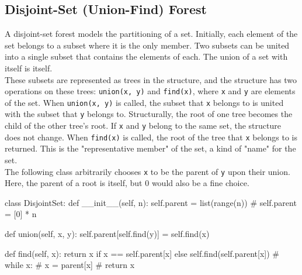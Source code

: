 \documentclass[12pt, titlepage]{article}
\begin{document}
\subsection{Disjoint-Set (Union-Find) Forest}
A disjoint-set forest models the partitioning of a set. Initially, each element of the set belongs to a subset where it is the only member. Two subsets can be united into a single subset that contains the elements of each. The union of a set with itself is itself. \\

These subsets are represented as trees in the structure, and the structure has two operations on these trees: \texttt{union(x, y)} and \texttt{find(x)}, where \texttt{x} and \texttt{y} are elements of the set. When \texttt{union(x, y)} is called, the subset that \texttt{x} belongs to is united with the subset that \texttt{y} belongs to. Structurally, the root of one tree becomes the child of the other tree's root. If \texttt{x} and \texttt{y} belong to the same set, the structure does not change. When \texttt{find(x)} is called, the root of the tree that \texttt{x} belongs to is returned. This is the "representative member" of the set, a kind of "name" for the set. \\

The following class arbitrarily chooses \texttt{x} to be the parent of \texttt{y} upon their union. Here, the parent of a root is itself, but $0$ would also be a fine choice.
\medskip
\begin{python}
class DisjointSet:
    def __init__(self, n):
        self.parent = list(range(n))
        # self.parent = [0] * n

    def union(self, x, y):
        self.parent[self.find(y)] = self.find(x)

    def find(self, x):
        return x if x == self.parent[x] else self.find(self.parent[x])
        # while x:
        #     x = parent[x]
        # return x
\end{python}
\bigskip
\end{document}
